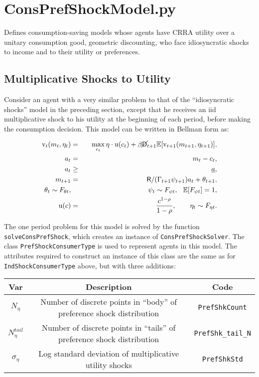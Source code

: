 \documentclass[12pt,titlepage,letterpaper]{econtex}
\newcommand{\E}{\mathbb{E}}
\begin{document}
\newpage

\section{ConsPrefShockModel.py}

Defines consumption-saving models whose agents have CRRA utility over a unitary consumption good, geometric discounting, who face idiosyncratic shocks to income and to their utility or preferences.

\subsection{Multiplicative Shocks to Utility}

Consider an agent with a very similar problem to that of the ``idiosyncratic shocks'' model in the preceding section, except that he receives an iid multiplicative shock to his utility at the beginning of each period, before making the consumption decision.  This model can be written in Bellman form as:

\begin{eqnarray*}
\vFunc_t(m_t,\eta_t) &=& \max_{c_t} \eta \cdot \utilFunc(c_t) + \beta \PLives_{t+1} \E [\vFunc_{t+1}(m_{t+1},\eta_{t+1}) ], \\
a_t &=& m_t - c_t, \\
a_t &\geq& \underline{a}, \\
m_{t+1} &=& \Rfree/(\Gamma_{t+1} \psi_{t+1}) a_t + \theta_{t+1}, \\
\theta_t \sim F_{\theta t}, &\qquad& \psi_t \sim F_{\psi t}, \hspace{0.25cm} \E[F_{\psi t}] = 1, \\
\utilFunc(c) &=& \frac{c^{1-\CRRA}}{1-\CRRA}, \qquad \eta_t \sim F_{\eta t}.
\end{eqnarray*}

The one period problem for this model is solved by the function \texttt{solveConsPrefShock}, which creates an instance of \texttt{ConsPrefShockSolver}.  The class \texttt{PrefShockConsumerType} is used to represent agents in this model.  The attributes required to construct an instance of this class are the same as for \texttt{IndShockConsumerType} above, but with three additions:
\begin{table}[h!]
\centering
\begin{tabular}{c c c}
Var & Description & Code \\
\hline
$N_\eta$ & Number of discrete points in ``body'' of preference shock distribution & \texttt{PrefShkCount} \\
$N_\eta^{tail}$ & Number of discrete points in ``tails'' of preference shock distribution & \texttt{PrefShk\_tail\_N} \\
$\sigma_\eta$ & Log standard deviation of multiplicative utility shocks & \texttt{PrefShkStd}
\end{tabular}
\end{table}
\end{document}

